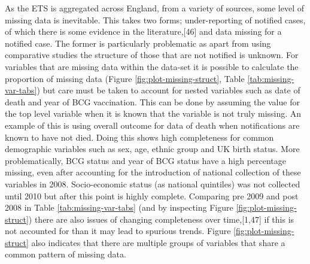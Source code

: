 \documentclass[11pt,twoside]{bristolthesis}
\begin{document}
  As the ETS is aggregated across England, from a variety of sources, some level of missing data is inevitable. This takes two forms; under-reporting of notified cases, of which there is some evidence in the literature,{[}46{]} and data missing for a notified case. The former is particularly problematic as apart from using comparative studies the structure of those that are not notified is unknown. For variables that are missing data within the data-set it is possible to calculate the proportion of missing data (Figure \ref{fig:plot-missing-struct}, Table \ref{tab:missing-var-tabs}) but care must be taken to account for nested variables such as date of death and year of BCG vaccination. This can be done by assuming the value for the top level variable when it is known that the variable is not truly missing. An example of this is using overall outcome for data of death when notifications are known to have not died. Doing this shows high completeness for common demographic variables such as sex, age, ethnic group and UK birth status. More problematically, BCG status and year of BCG status have a high percentage missing, even after accounting for the introduction of national collection of these variables in 2008. Socio-economic status (as national quintiles) was not collected until 2010 but after this point is highly complete. Comparing pre 2009 and post 2008 in Table \ref{tab:missing-var-tabs} (and by inspecting Figure \ref{fig:plot-missing-struct}) there are also issues of changing completeness over time,{[}1,47{]} if this is not accounted for than it may lead to spurious trends. Figure \ref{fig:plot-missing-struct} also indicates that there are multiple groups of variables that share a common pattern of missing data.
\end{document}
